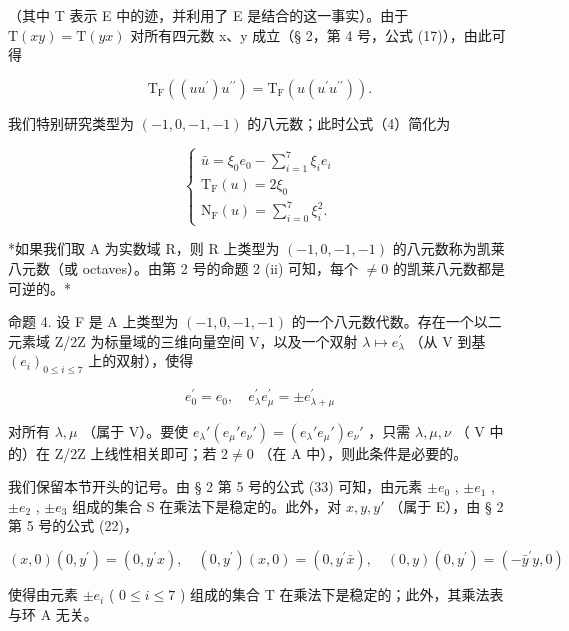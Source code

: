 （其中 T 表示 E 中的迹，并利用了 E 是结合的这一事实）。由于 \(\mathrm{T}(xy) = \mathrm{T}(yx)\) 对所有四元数 x、y 成立（§ 2，第 4 号，公式 (17)），由此可得

\[
\mathrm{T} _ {\mathrm{F}} ((u u ^ {\prime}) u ^ {\prime \prime}) = \mathrm{T} _ {\mathrm{F}} (u (u ^ {\prime} u ^ {\prime \prime})).\tag{5}
\]

我们特别研究类型为 \((-1, 0, -1, -1)\) 的八元数；此时公式（4）简化为

\[
\left\{ \begin{array}{c} {\bar {u}} = \xi_ {0} e _ {0} - \sum_ {i = 1} ^ {7} \xi_ {i} e _ {i} \\ \mathrm{T} _ {\mathrm{F}} (u) = 2 \xi_ {0} \\ \mathrm{N} _ {\mathrm{F}} (u) = \sum_ {i = 0} ^ {7} \xi_ {i} ^ {2}. \end{array} \right.\tag{6}
\]

*如果我们取 A 为实数域 R，则 R 上类型为 \((-1,0,-1,-1)\) 的八元数称为凯莱八元数（或 octaves）。由第 2 号的命题 2 (ii) 可知，每个 \(\neq0\) 的凯莱八元数都是可逆的。*

命题 4. 设 F 是 A 上类型为 \((-1,0,-1,-1)\) 的一个八元数代数。存在一个以二元素域 Z/2Z 为标量域的三维向量空间 V，以及一个双射 \(\lambda\mapsto e_{\lambda}^{\prime}\) （从 V 到基 \((e_{i})_{0\leq i\leq7}\) 上的双射），使得

\[
e _ {0} ^ {\prime} = e _ {0}, \quad e _ {\lambda} ^ {\prime} e _ {\mu} ^ {\prime} = \pm e _ {\lambda + \mu} ^ {\prime}\tag{7}
\]

对所有 \(\lambda, \mu\) （属于 V）。要使 \(e_{\lambda}'(e_{\mu}'e_{\nu}') = (e_{\lambda}'e_{\mu}')e_{\nu}'\) ，只需 \(\lambda, \mu, \nu\) （ V 中的）在 Z/2Z 上线性相关即可；若 \(2 \neq 0\) （在 A 中），则此条件是必要的。

我们保留本节开头的记号。由 § 2 第 5 号的公式 (33) 可知，由元素 \(\pm e_0\) , \(\pm e_1\) , \(\pm e_2\) , \(\pm e_3\) 组成的集合 S 在乘法下是稳定的。此外，对 \(x, y, y'\) （属于 E），由 § 2 第 5 号的公式 (22)，

\[
(x, 0) (0, y ^ {\prime}) = (0, y ^ {\prime} x), \quad (0, y ^ {\prime}) (x, 0) = (0, y ^ {\prime} \bar {x}), \quad (0, y) (0, y ^ {\prime}) = (- \bar {y} ^ {\prime} y, 0)\tag{8}
\]

使得由元素 \(\pm e_{i}\) ( \(0 \leqslant i \leqslant 7\) ) 组成的集合 T 在乘法下是稳定的；此外，其乘法表与环 A 无关。

